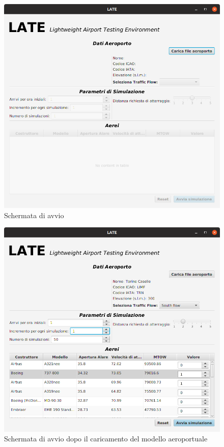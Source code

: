 \documentclass[a4paper, 12pt]{article}
\begin{document}
\begin{figure}[H]
\caption{Schermata di avvio}
 \label{fig:avvio1}
\hfill \includegraphics[height=0.42\textheight]{resources/images/Interfaccia_inizio.png} \hspace*{\fill}
\end{figure}

\begin{figure}[H]
\caption{Schermata di avvio dopo il caricamento del modello aeroportuale}
 \label{fig:avvio2}
\hfill \includegraphics[height=0.42\textheight]{resources/images/Interfaccia_caricaAeroporto.png}\hspace*{\fill}
\end{figure}
\end{document}
